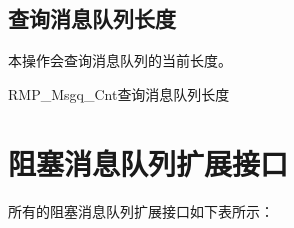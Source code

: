 \subsection{查询消息队列长度}\label{subsec:query-the-message-queue-length}

本操作会查询消息队列的当前长度。

\begin{apidesc}{RMP\_Msgq\_Cnt}{查询消息队列长度}
    \begin{apiparams}
    \end{apiparams}
    \begin{apiret}
    \end{apiret}
\end{apidesc}

\section{阻塞消息队列扩展接口}\label{sec:blocking-message-queue-extension-interface}

所有的阻塞消息队列扩展接口如下表所示：

\label{tab:blocking-message-queue-extension-interface-summary}

